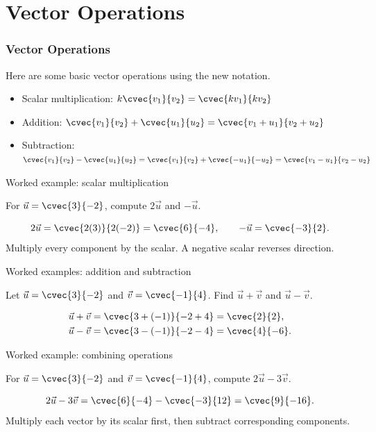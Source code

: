 \section[Operation]{Vector Operations}
\frame{\sectionpage}

\begin{frame}
\frametitle{Vector Operations}
Here are some basic vector operations using the new notation.
\begin{defn}{}{}
\begin{itemize}
\item Scalar multiplication: $k\cvec{v_1}{v_2} = \cvec{kv_1}{kv_2}$
\item Addition: $\cvec{v_1}{v_2} + \cvec{u_1}{u_2} = \cvec{v_1 + u_1}{v_2 + u_2}$
\item Subtraction: $\cvec{v_1}{v_2} - \cvec{u_1}{u_2} = \cvec{v_1}{v_2} + \cvec{-u_1}{-u_2} = \cvec{v_1 - u_1}{v_2 - u_2}$
\end{itemize}
\end{defn}
\end{frame}

\begin{frame}[t]{Worked example: scalar multiplication}
\begin{ex}
For $\vec{u}=\cvec{3}{-2}$, compute $2\vec{u}$ and $-\vec{u}$.
\end{ex}
\begin{sol}
\[
2\vec{u}=\cvec{2(3)}{2(-2)}=\cvec{6}{-4},
\qquad -\vec{u}=\cvec{-3}{2}.
\]
Multiply every component by the scalar. A negative scalar reverses direction.
\end{sol}
\end{frame}

\begin{frame}[t]{Worked examples: addition and subtraction}\small
\begin{ex}
Let $\vec{u}=\cvec{3}{-2}$ and $\vec{v}=\cvec{-1}{4}$.
Find $\vec{u}+\vec{v}$ and $\vec{u}-\vec{v}$.
\end{ex}
\begin{sol}
\begin{align*}
\vec{u}+\vec{v} &= \cvec{3+(-1)}{-2+4} = \cvec{2}{2},\\
\vec{u}-\vec{v} &= \cvec{3-(-1)}{-2-4} = \cvec{4}{-6}.
\end{align*}
\end{sol}
\end{frame}

\begin{frame}[t]{Worked example: combining operations}
\begin{ex}
For $\vec{u}=\cvec{3}{-2}$ and $\vec{v}=\cvec{-1}{4}$,
compute $2\vec{u}-3\vec{v}$.
\end{ex}
\begin{sol}
\[
2\vec{u}-3\vec{v}
=\cvec{6}{-4}-\cvec{-3}{12}
=\cvec{9}{-16}.
\]
Multiply each vector by its scalar first, then subtract corresponding components.
\end{sol}
\end{frame}




